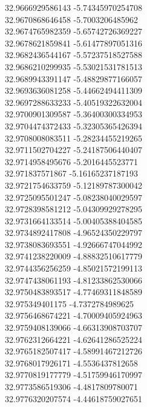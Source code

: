 {32.9666929586143	-5.74345970254708\\
32.9670868646458	-5.7003206485962\\
32.9674765982359	-5.65742726369227\\
32.9678621859841	-5.61477897051316\\
32.9682436544167	-5.57237518527588\\
32.9686210299935	-5.53021531781513\\
32.9689943391147	-5.48829877166057\\
32.9693636081258	-5.44662494411309\\
32.9697288633233	-5.40519322632004\\
32.9700901309587	-5.36400300334953\\
32.9704474372433	-5.32305365426394\\
32.9708008083511	-5.28234455219265\\
32.9711502704227	-5.24187506440407\\
32.9714958495676	-5.2016445523771\\
32.971837571867	-5.16165237187193\\
32.9721754633759	-5.12189787300042\\
32.9725095501247	-5.08238040029597\\
32.9728398581212	-5.04309929278295\\
32.9731664133514	-5.00405388404585\\
32.9734892417808	-4.96524350229797\\
32.9738083693551	-4.92666747044992\\
32.9741238220009	-4.88832510617779\\
32.9744356256259	-4.85021572199113\\
32.9747438061193	-4.81233862530066\\
32.9750483893517	-4.77469311848589\\
32.975349401175	-4.7372784989625\\
32.9756468674221	-4.70009405924963\\
32.9759408139066	-4.66313908703707\\
32.9762312664221	-4.62641286525224\\
32.9765182507417	-4.58991467212726\\
32.9768017926171	-4.5536437812658\\
32.9770819177779	-4.51759946170997\\
32.9773586519306	-4.4817809780071\\
32.9776320207574	-4.44618759027651\\
}

